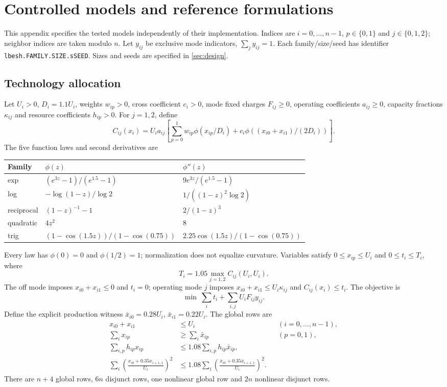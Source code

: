 \section{Controlled models and reference formulations}\label{app:models}
This appendix specifies the tested models independently of their implementation. Indices are $i=0,\ldots,n-1$, $p\in\{0,1\}$ and $j\in\{0,1,2\}$; neighbor indices are taken modulo $n$. Let $y_{ij}$ be exclusive mode indicators, $\sum_jy_{ij}=1$. Each family/size/seed has identifier \texttt{lbesh.FAMILY.SIZE.sSEED}. Sizes and seeds are specified in \cref{sec:design}.

\subsection{Technology allocation}
Let $U_i>0$, $D_i=1.1U_i$, weights $w_{ip}>0$, cross coefficient $c_i>0$, mode fixed charges $F_{ij}\ge0$, operating coefficients $a_{ij}\ge0$, capacity fractions $\kappa_{ij}$ and resource coefficients $h_{ip}>0$. For $j=1,2$, define
\begin{equation}\label{eq:generator-cost}
 C_{ij}(x_i)=U_i a_{ij}\left[\sum_{p=0}^1w_{ip}\phi(x_{ip}/D_i)
 +c_i\phi\!\left((x_{i0}+x_{i1})/(2D_i)\right)\right].
\end{equation}
The five function laws and second derivatives are
\begin{center}\small
\begin{tabular}{lll}\toprule
Family & $\phi(z)$ & $\phi''(z)$\\\midrule
exp & $(e^{3z}-1)/(e^{1.5}-1)$ & $9e^{3z}/(e^{1.5}-1)$\\
log & $-\log(1-z)/\log 2$ & $1/((1-z)^2\log 2)$\\
reciprocal & $(1-z)^{-1}-1$ & $2/(1-z)^3$\\
quadratic & $4z^2$ & $8$\\
trig & $(1-\cos(1.5z))/(1-\cos(0.75))$ & $2.25\cos(1.5z)/(1-\cos(0.75))$\\\bottomrule
\end{tabular}\end{center}
Every law has $\phi(0)=0$ and $\phi(1/2)=1$; normalization does not equalize curvature. Variables satisfy $0\le x_{ip}\le U_i$ and $0\le t_i\le T_i$, where
\[
 T_i=1.05\max_{j=1,2} C_{ij}(U_i,U_i).
\]
The off mode imposes $x_{i0}+x_{i1}\le0$ and $t_i=0$; operating mode $j$ imposes $x_{i0}+x_{i1}\le U_i\kappa_{ij}$ and $C_{ij}(x_i)\le t_i$. The objective is
\[
 \min\ \sum_i t_i+\sum_{i,j}U_iF_{ij}y_{ij}.
\]
Define the explicit production witness $\bar x_{i0}=0.28U_i$, $\bar x_{i1}=0.22U_i$. The global rows are
\begin{align*}
 x_{i0}+x_{i1}&\le U_i &&(i=0,\ldots,n-1),\\
 \sum_i x_{ip}&\ge\sum_i\bar x_{ip} &&(p=0,1),\\
 \sum_{i,p}h_{ip}x_{ip}&\le1.08\sum_{i,p}h_{ip}\bar x_{ip},\\
 \sum_i\left(\frac{x_{i0}+0.35x_{i+1,1}}{U_i}\right)^2
 &\le1.08\sum_i\left(\frac{\bar x_{i0}+0.35\bar x_{i+1,1}}{U_i}\right)^2.
\end{align*}
There are $n+4$ global rows, $6n$ disjunct rows, one nonlinear global row and $2n$ nonlinear disjunct rows.

